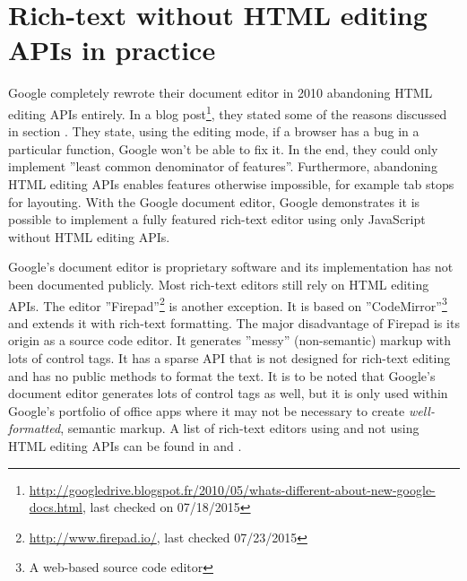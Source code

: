 \section{Rich-text without HTML editing APIs in practice} 

Google completely rewrote their document editor in 2010 abandoning HTML editing APIs entirely. In a blog post\footnote{\url{http://googledrive.blogspot.fr/2010/05/whats-different-about-new-google-docs.html}, last checked on 07/18/2015}, they stated some of the reasons discussed in section . They state, using the editing mode, if a browser has a bug in a particular function, Google won't be able to fix it. In the end, they could only implement ''least common denominator of features''. Furthermore, abandoning HTML editing APIs enables features otherwise impossible, for example tab stops for layouting\cite{bw}. With the Google document editor, Google demonstrates it is possible to implement a fully featured rich-text editor using only JavaScript without HTML editing APIs.




Google's document editor is proprietary software and its implementation has not been documented publicly. Most rich-text editors still rely on HTML editing APIs. The editor ''Firepad''\footnote{\url{http://www.firepad.io/}, last checked 07/23/2015} is another exception. It is based on ''CodeMirror''\footnote{A web-based source code editor} and extends it with rich-text formatting. The major disadvantage of Firepad is its origin as a source code editor. It generates ''messy'' (non-semantic) markup with lots of control tags. It has a sparse API that is not designed for rich-text editing and has no public methods to format the text. It is to be noted that Google's document editor generates lots of control tags as well, but it is only used within Google's portfolio of office apps where it may not be necessary to create \textit{well-formatted}, semantic markup. A list of rich-text editors using and not using HTML editing APIs can be found in  and . %


